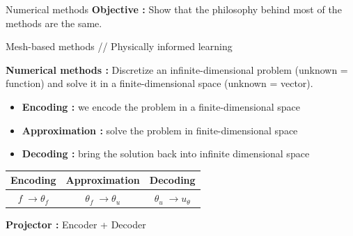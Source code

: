 \begin{frame}{Numerical methods}
	\textbf{Objective :} Show that the philosophy behind most of the methods are the same.
	\begin{center}
		Mesh-based methods \hspace{5pt} // \hspace{5pt} Physically informed learning
	\end{center}
	
	\textbf{Numerical methods :} Discretize an infinite-dimensional problem (unknown = function) and solve it in a finite-dimensional space (unknown = vector).
	\begin{itemize}[\textbullet]
		\item \textbf{Encoding :} we encode the problem in a finite-dimensional space
		\item \textbf{Approximation :} solve the problem in finite-dimensional space
		\item \textbf{Decoding :} bring the solution back into infinite dimensional space
	\end{itemize}
	
	\begin{center}
		\begin{tabular}{|c|c|c|}
			\hline
			\textbf{Encoding} & \textbf{Approximation} & \textbf{Decoding} \\
			\hline
			$f \; \rightarrow \theta_f$ & $\theta_f \; \rightarrow \theta_u$ & $\theta_u \; \rightarrow u_\theta$ \\
			\hline
		\end{tabular}
	\end{center}

	\bigskip

	\textbf{Projector :} Encoder + Decoder
	\begin{figure}[htb]
		\vspace{-10pt}
	\end{figure}
\end{frame}
